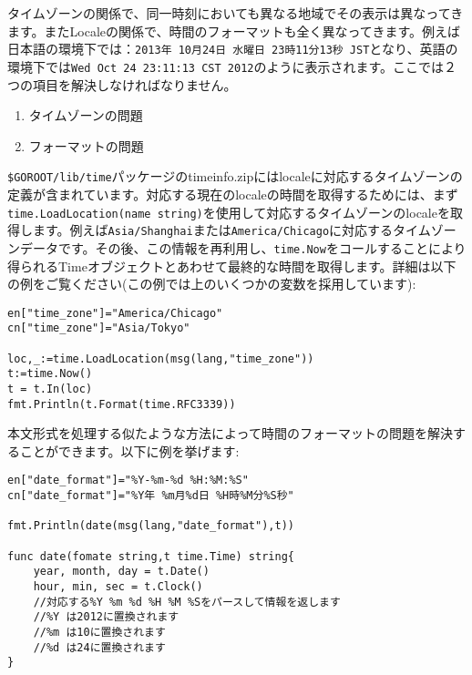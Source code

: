 タイムゾーンの関係で、同一時刻においても異なる地域でその表示は異なってきます。またLocaleの関係で、時間のフォーマットも全く異なってきます。例えば日本語の環境下では：\texttt{2013年 10月24日 水曜日 23時11分13秒 JST}となり、英語の環境下では\texttt{Wed Oct 24 23:11:13 CST 2012}のように表示されます。ここでは２つの項目を解決しなければなりません。

\begin{enumerate}
  \item タイムゾーンの問題
  \item フォーマットの問題
\end{enumerate}

\texttt{\$GOROOT/lib/time}パッケージのtimeinfo.zipにはlocaleに対応するタイムゾーンの定義が含まれています。対応する現在のlocaleの時間を取得するためには、まず\texttt{time.LoadLocation(name string)}を使用して対応するタイムゾーンのlocaleを取得します。例えば\texttt{Asia/Shanghai}または\texttt{America/Chicago}に対応するタイムゾーンデータです。その後、この情報を再利用し、\texttt{time.Now}をコールすることにより得られるTimeオブジェクトとあわせて最終的な時間を取得します。詳細は以下の例をご覧ください(この例では上のいくつかの変数を採用しています):


\begin{lstlisting}[numbers=none]
en["time_zone"]="America/Chicago"
cn["time_zone"]="Asia/Tokyo"

loc,_:=time.LoadLocation(msg(lang,"time_zone"))
t:=time.Now()
t = t.In(loc)
fmt.Println(t.Format(time.RFC3339))
\end{lstlisting}

本文形式を処理する似たような方法によって時間のフォーマットの問題を解決することができます。以下に例を挙げます:

\begin{lstlisting}[numbers=none]
en["date_format"]="%Y-%m-%d %H:%M:%S"
cn["date_format"]="%Y年 %m月%d日 %H時%M分%S秒"

fmt.Println(date(msg(lang,"date_format"),t))

func date(fomate string,t time.Time) string{
    year, month, day = t.Date()
    hour, min, sec = t.Clock()
    //対応する%Y %m %d %H %M %Sをパースして情報を返します
    //%Y は2012に置換されます
    //%m は10に置換されます
    //%d は24に置換されます
}
\end{lstlisting}


